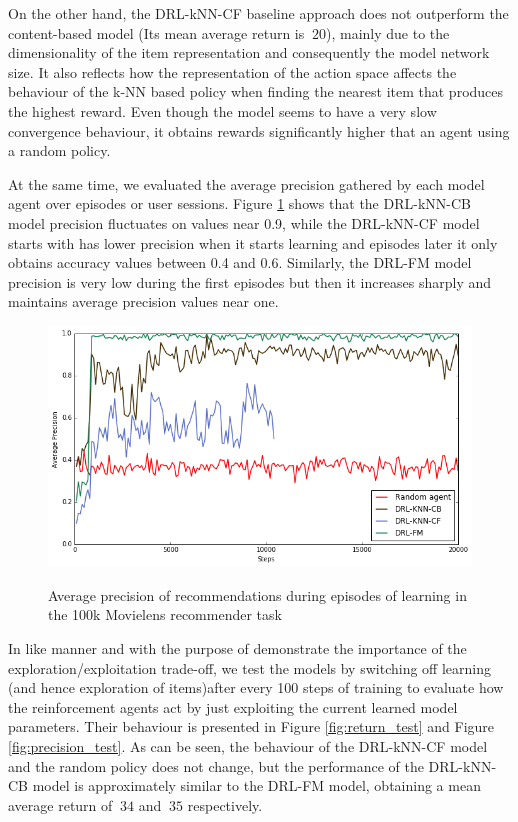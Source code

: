 On the other hand, the DRL-kNN-CF baseline approach does not outperform the content-based model (Its mean average return is $~ 20$), mainly due to the dimensionality of the item representation and consequently the model network size. It also reflects how the representation of the action space affects the behaviour of the k-NN based policy when finding the nearest item that produces the highest reward. Even though the model seems to have a very slow convergence behaviour, it obtains rewards significantly higher that an agent using a random policy.

At the same time, we evaluated the average precision gathered by each model agent over episodes or user sessions. Figure \ref{fig:precision_train} shows that the DRL-kNN-CB model precision fluctuates on values near 0.9, while the DRL-kNN-CF model starts with has lower precision when it starts learning and episodes later it only obtains accuracy values between 0.4 and 0.6. Similarly, the DRL-FM model precision is very low during the first episodes but then it increases sharply and maintains average precision values near one.

\begin{figure}[!htbp]
\centering
\caption{Average precision of recommendations during episodes of learning in the 100k Movielens recommender task}
\includegraphics[scale=0.5]{images/eval_precision_train}
\label{fig:precision_train}
\end{figure}

In like manner and with the purpose of demonstrate the importance of the exploration/exploitation trade-off, we test the models by switching off learning (and hence exploration of items)after every 100 steps of training to evaluate how the reinforcement agents act by just exploiting the current learned model parameters. Their behaviour is presented in Figure \ref{fig:return_test} and Figure \ref{fig:precision_test}. As can be seen, the behaviour of the DRL-kNN-CF model and the random policy does not change, but the performance of the DRL-kNN-CB model is approximately similar to the DRL-FM model, obtaining a mean average return of $~34$ and $~ 35$ respectively.

